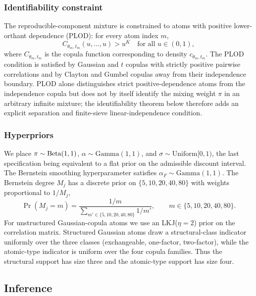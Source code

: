 \subsubsection{Identifiability constraint}

The reproducible-component mixture is constrained to atoms with positive lower-orthant dependence (PLOD): for every atom index $m$,
\begin{equation}
C_{\theta_m,t_m}(u,\ldots,u) > u^K \quad \text{for all } u\in(0,1),
\label{eq:plod}
\end{equation}
where $C_{\theta_m,t_m}$ is the copula function corresponding to density $c_{\theta_m,t_m}$. The PLOD condition \citep[Definition 2.1]{Joe1997} is satisfied by Gaussian and $t$ copulas with strictly positive pairwise correlations and by Clayton and Gumbel copulas away from their independence boundary. PLOD alone distinguishes strict positive-dependence atoms from the independence copula but does not by itself identify the mixing weight $\pi$ in an arbitrary infinite mixture; the identifiability theorem below therefore adds an explicit separation and finite-sieve linear-independence condition.

\subsubsection{Hyperpriors}
\label{sec:hyperpriors}

We place $\pi \sim \mathrm{Beta}(1,1)$, $\alpha\sim\mathrm{Gamma}(1,1)$, and $\sigma\sim\mathrm{Uniform}[0,1)$, the last specification being equivalent to a flat prior on the admissible discount interval. The Bernstein smoothing hyperparameter satisfies $\alpha_F\sim\mathrm{Gamma}(1,1)$. The Bernstein degree $M_j$ has a discrete prior on $\{5,10,20,40,80\}$ with weights proportional to $1/M_j$,
\begin{equation}
\Pr(M_j=m)=\frac{1/m}{\sum_{m'\in\{5,10,20,40,80\}}1/m'},\qquad m\in\{5,10,20,40,80\}.
\label{eq:m-prior}
\end{equation}
For unstructured Gaussian-copula atoms we use an LKJ($\eta=2$) prior \citep{LewandowskiKurowickaJoe2009} on the correlation matrix. Structured Gaussian atoms draw a structural-class indicator uniformly over the three classes (exchangeable, one-factor, two-factor), while the atomic-type indicator is uniform over the four copula families. Thus the structural support has size three and the atomic-type support has size four.

\subsection{Inference}
\label{sec:inference}

